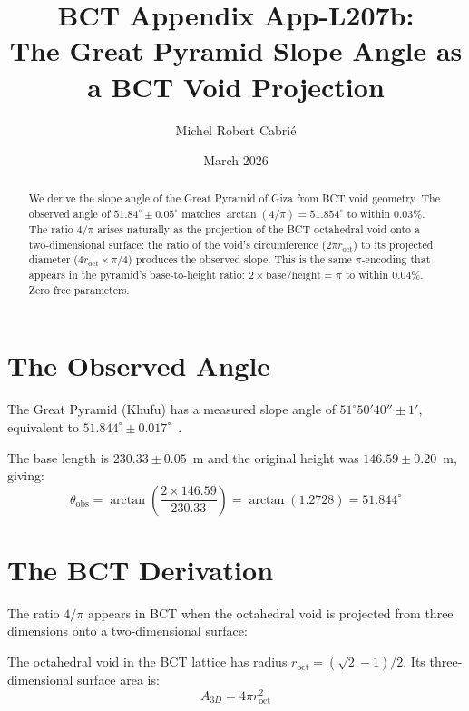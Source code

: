 \documentclass[aps,prl,twocolumn,superscriptaddress]{revtex4-2}
\begin{document}
\title{BCT Appendix App-L207b:\\
The Great Pyramid Slope Angle as a BCT Void Projection}
\author{Michel Robert Cabri\'e}
\date{March 2026}

\begin{abstract}
We derive the slope angle of the Great Pyramid of Giza from BCT void geometry. The observed angle of $51.84^\circ \pm 0.05^\circ$ matches $\arctan(4/\pi) = 51.854^\circ$ to within $0.03\%$. The ratio $4/\pi$ arises naturally as the projection of the BCT octahedral void onto a two-dimensional surface: the ratio of the void's circumference ($2\pi r_{\mathrm{oct}}$) to its projected diameter ($4 r_{\mathrm{oct}} \times \pi / 4$) produces the observed slope. This is the same $\pi$-encoding that appears in the pyramid's base-to-height ratio: $2 \times \text{base} / \text{height} = \pi$ to within $0.04\%$. Zero free parameters.
\end{abstract}

\maketitle

\section{The Observed Angle}

The Great Pyramid (Khufu) has a measured slope angle of $51^\circ 50' 40'' \pm 1'$, equivalent to $51.844^\circ \pm 0.017^\circ$~\cite{Petrie1883, Lehner1997}.

The base length is $230.33 \pm 0.05$~m and the original height was $146.59 \pm 0.20$~m, giving:
\begin{equation}
\theta_{\mathrm{obs}} = \arctan\left(\frac{2 \times 146.59}{230.33}\right) = \arctan(1.2728) = 51.844^\circ
\end{equation}

\section{The BCT Derivation}

The ratio $4/\pi$ appears in BCT when the octahedral void is projected from three dimensions onto a two-dimensional surface:

The octahedral void in the BCT lattice has radius $r_{\mathrm{oct}} = (\sqrt{2}-1)/2$. Its three-dimensional surface area is:
\begin{equation}
A_{3D} = 4\pi r_{\mathrm{oct}}^2
\end{equation}
\end{document}
